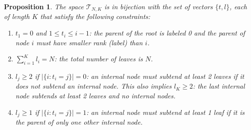 \documentclass{article}
\newtheorem{proposition}[theorem]{Proposition}
\begin{document}
\begin{proposition} \label{prop:string-bijection}
The space $\mathcal{T}_{N,K}$ is in bijection with the set of vectors $\{t, l\}$, each of length $K$ that satisfy the following constraints:  
\begin{enumerate}[label={S\arabic*.}]
    \item $t_1=0$ and $1\leq t_i\leq i-1$: the parent of the root is labeled 0 and the parent of node $i$ must have smaller rank (label) than $i$. 
    \item $\sum_{i=1}^K l_i=N$: the total number of leaves is $N$.
    \item $l_j\geq 2$ if $| \{ i: t_i= j\} | =0$: an internal node must subtend at least 2 leaves if it does not subtend an internal node. This also implies $l_K \geq 2$: the last internal node subtends at least 2 leaves and no internal nodes.
    \item $l_j\geq 1$ if $| \{ i: t_i= j\} | = 1$: an internal node must subtend at least 1 leaf if it is the parent of only one other internal node. 
\end{enumerate}
\end{proposition}
\end{document}
